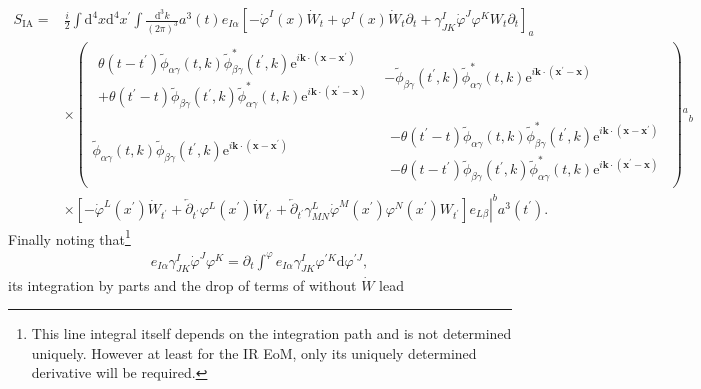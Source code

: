 \documentclass[aps, prd
, preprint
, nofootinbib 
]{revtex4-1}
\newcommand{\dd}{\mathrm{d}}
\newcommand{\ee}{\mathrm{e}}
\newcommand{\dk}{\frac{\dd^3k}{(2\pi)^3}}
\newcommand{\bae}[1]{\begin{align} #1 \end{align}}
\newcommand{\bpme}[1]{\begin{pmatrix} #1 \end{pmatrix}}
\begin{document}
\bae{
	S_\text{IA}=&\frac{i}{2}\int\dd^4x\dd^4x^\prime\int\dk a^3(t)e_{I\alpha}\left[-\dot{\varphi}^I(x)\dot{W}_t+\varphi^I(x)\dot{W}_t\partial_t
	+\gamma^I_{JK}\dot{\varphi}^J\varphi^KW_t\partial_t\right]_a \nonumber \\
	&\times\bpme{
		\begin{array}{c}
			\theta(t-t^\prime)\tilde{\phi}_{\alpha\gamma}(t,k)\tilde{\phi}_{\beta\gamma}^*(t^\prime,k)
			\ee^{i\mathbf{k}\cdot(\mathbf{x}-\mathbf{x}^\prime)} \\
			+\theta(t^\prime-t)\tilde{\phi}_{\beta\gamma}(t^\prime,k)\tilde{\phi}_{\alpha\gamma}^*(t,k)
			\ee^{i\mathbf{k}\cdot(\mathbf{x}^\prime-\mathbf{x})}
		\end{array}
		& -\tilde{\phi}_{\beta\gamma}(t^\prime,k)\tilde{\phi}_{\alpha\gamma}^*(t,k)\ee^{i\mathbf{k}\cdot(\mathbf{x}^\prime-\mathbf{x})} \\
		\tilde{\phi}_{\alpha\gamma}(t,k)\tilde{\phi}_{\beta\gamma}(t^\prime,k)\ee^{i\mathbf{k}\cdot(\mathbf{x}-\mathbf{x}^\prime)} &
		\begin{array}{c}
			-\theta(t^\prime-t)\tilde{\phi}_{\alpha\gamma}(t,k)\tilde{\phi}_{\beta\gamma}^*(t^\prime,k)
			\ee^{i\mathbf{k}\cdot(\mathbf{x}-\mathbf{x}^\prime)} \\
			-\theta(t-t^\prime)\tilde{\phi}_{\beta\gamma}(t^\prime,k)\tilde{\phi}_{\alpha\gamma}^*(t,k)
			\ee^{i\mathbf{k}\cdot(\mathbf{x}^\prime-\mathbf{x})}
		\end{array}
	}{}^a{}_b \nonumber \\
	&\times\left.\left[-\dot{\varphi}^L(x^\prime)\dot{W}_{t^\prime}+\overleftarrow{\partial}_{t^\prime}\varphi^L(x^\prime)\dot{W}_{t^\prime}
	+\overleftarrow{\partial}_{t^\prime}\gamma^L_{MN}\dot{\varphi}^M(x^\prime)\varphi^N(x^\prime)W_{t^\prime}\right]e_{L\beta}\right|^ba^3(t^\prime).
}
Finally noting that\footnote{This line integral itself depends on the integration path and is not determined uniquely. However at least for the IR EoM,
only its uniquely determined derivative will be required.}
\bae{
	e_{I\alpha}\gamma^I_{JK}\dot{\varphi}^J\varphi^K=\partial_t\int^\varphi e_{I\alpha}\gamma^I_{JK}\varphi^{\prime K}\dd\varphi^{\prime J},
}
its integration by parts and the drop of terms of without $\dot{W}$ lead
\end{document}
